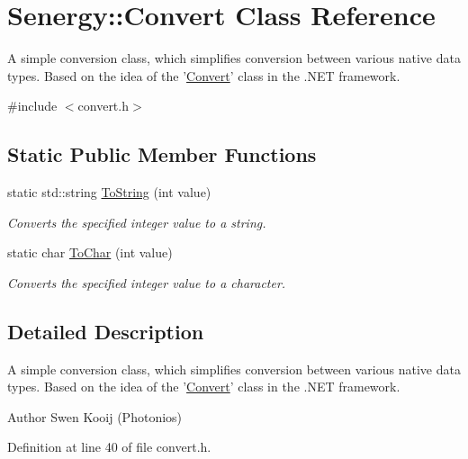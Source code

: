 \hypertarget{class_senergy_1_1_convert}{\section{Senergy\-:\-:Convert Class Reference}
\label{class_senergy_1_1_convert}
}


A simple conversion class, which simplifies conversion between various native data types. Based on the idea of the '\hyperlink{class_senergy_1_1_convert}{Convert}' class in the .N\-E\-T framework.  




{\ttfamily \#include $<$convert.\-h$>$}

\subsection*{Static Public Member Functions}
\begin{DoxyCompactItemize}
\item 
static std\-::string \hyperlink{class_senergy_1_1_convert_a80cf7b84b0ff65171da68ca40cbf817f}{To\-String} (int value)
\begin{DoxyCompactList}\small\item\em Converts the specified integer value to a string. \end{DoxyCompactList}\item 
static char \hyperlink{class_senergy_1_1_convert_a66c09e2b461268212cc384e71a2f57c6}{To\-Char} (int value)
\begin{DoxyCompactList}\small\item\em Converts the specified integer value to a character. \end{DoxyCompactList}\end{DoxyCompactItemize}


\subsection{Detailed Description}
A simple conversion class, which simplifies conversion between various native data types. Based on the idea of the '\hyperlink{class_senergy_1_1_convert}{Convert}' class in the .N\-E\-T framework. 

\begin{DoxyAuthor}{Author}
Swen Kooij (Photonios) 
\end{DoxyAuthor}


Definition at line 40 of file convert.\-h.



